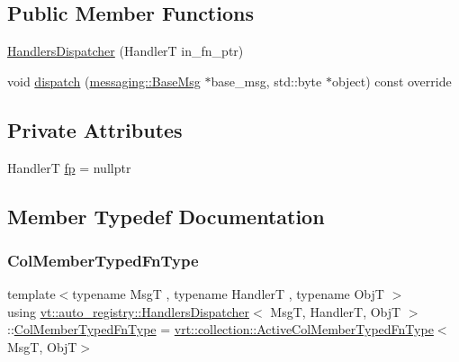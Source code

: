 \subsection*{Public Member Functions}
\begin{DoxyCompactItemize}
\item 
\hyperlink{structvt_1_1auto__registry_1_1_handlers_dispatcher_aea820469903ae2c06a6e9934d3e8d0cc}{Handlers\+Dispatcher} (HandlerT in\+\_\+fn\+\_\+ptr)
\item 
void \hyperlink{structvt_1_1auto__registry_1_1_handlers_dispatcher_a2011677dbfc1c7f8425066c4311c53ce}{dispatch} (\hyperlink{structvt_1_1messaging_1_1_base_msg}{messaging\+::\+Base\+Msg} $\ast$base\+\_\+msg, std\+::byte $\ast$object) const override
\end{DoxyCompactItemize}
\subsection*{Private Attributes}
\begin{DoxyCompactItemize}
\item 
HandlerT \hyperlink{structvt_1_1auto__registry_1_1_handlers_dispatcher_a2fe52dbcfedb744c43a0579de7c7167f}{fp} = nullptr
\end{DoxyCompactItemize}


\subsection{Member Typedef Documentation}
\mbox{\label{structvt_1_1auto__registry_1_1_handlers_dispatcher_a6f1a72ba3eec14527af044a478416b4d}} 
\subsubsection{\texorpdfstring{Col\+Member\+Typed\+Fn\+Type}{ColMemberTypedFnType}}
{\footnotesize\ttfamily template$<$typename MsgT , typename HandlerT , typename ObjT $>$ \\
using \hyperlink{structvt_1_1auto__registry_1_1_handlers_dispatcher}{vt\+::auto\+\_\+registry\+::\+Handlers\+Dispatcher}$<$ MsgT, HandlerT, ObjT $>$\+::\hyperlink{structvt_1_1auto__registry_1_1_handlers_dispatcher_a6f1a72ba3eec14527af044a478416b4d}{Col\+Member\+Typed\+Fn\+Type} =  \hyperlink{namespacevt_1_1vrt_1_1collection_a87925616c03cf4ccc548d33b2fe172ee}{vrt\+::collection\+::\+Active\+Col\+Member\+Typed\+Fn\+Type}$<$MsgT, ObjT$>$}

